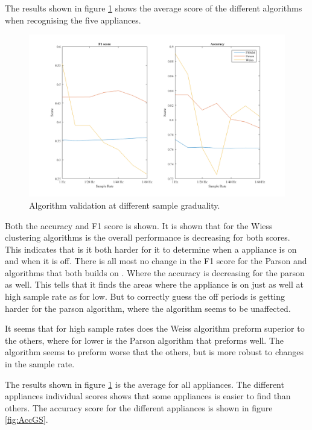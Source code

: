 The results shown in figure \ref{fig:DSE} shows the average score of the different algorithms when recognising the five appliances. 

\begin{figure}[H]
\centering
\includegraphics[width=1\textwidth]{billeder/AlgoScoreNilm.png}
\caption{Algorithm validation at different sample graduality.}
\label{fig:DSE}
\end{figure}

Both the accuracy and F1 score is shown. It is shown that for the Wiess clustering algorithms is the overall performance is decreasing for both scores. This indicates that is it both harder for it to determine when a appliance is on and when it is off. There is all most no change in the F1 score for the Parson and  algorithms that both builds on . Where the accuracy is decreasing for the parson as well. This tells that it finds the areas where the appliance is on just as well at high sample rate as for low. But to correctly guess the off periods is getting harder for the parson algorithm, where the  algorithm seems to be unaffected. 

It seems that for high sample rates does the Weiss algorithm preform superior to the others, where for lower is the Parson algorithm that preforms well. The  algorithm seems to preform worse that the others, but is more robust to changes in the sample rate. 

The results shown in figure \ref{fig:DSE} is the average for all appliances. The different appliances individual scores shows that some appliances is easier to find than others. The accuracy score for the different appliances is shown in figure \ref{fig:AccGS}. 

